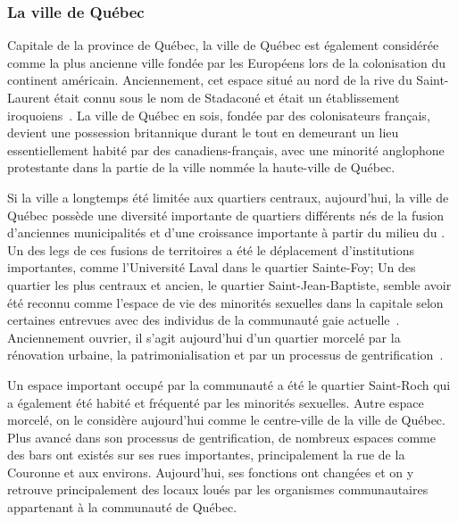 \subsubsection{La ville de Québec}
Capitale de la province de Québec, la ville de Québec est également considérée comme la plus ancienne ville fondée par les Européens lors de la colonisation du continent américain. 
Anciennement, cet espace situé au nord de la rive du Saint-Laurent était connu sous le nom de Stadaconé et était un établissement iroquoiens~\citep[91]{Dickason1996}. 
La ville de Québec en sois, fondée par des colonisateurs français, devient une possession britannique durant le  tout en demeurant un lieu essentiellement habité par des canadiens-français, avec une minorité anglophone protestante dans la partie de la ville nommée la haute-ville de Québec\missref{}.

Si la ville a longtemps été limitée aux quartiers centraux, aujourd'hui, la ville de Québec possède une diversité importante de quartiers différents nés de la fusion d'anciennes municipalités et d'une croissance importante à partir du milieu du . 
Un des legs de ces fusions de territoires a été le déplacement d'institutions importantes, comme l'Université Laval dans le quartier Sainte-Foy; Un des quartier les plus centraux et ancien, le quartier Saint-Jean-Baptiste, semble avoir été reconnu comme l'espace de vie des minorités sexuelles dans la capitale selon certaines entrevues avec des individus de la communauté gaie actuelle~\citep{CSJB2011}. 
Anciennement ouvrier, il s'agit aujourd'hui d'un quartier morcelé par la rénovation urbaine, la patrimonialisation et par un processus de gentrification~\citep{Hatvany2005,Mercier2014}.

Un espace important occupé par la communauté \lgbt{} a été le quartier Saint-Roch qui a également été habité et fréquenté par les minorités sexuelles.
Autre espace morcelé, on le considère aujourd'hui comme le centre-ville de la ville de Québec. 
Plus avancé dans son processus de gentrification, de nombreux espaces \lgbt{} comme des bars ont existés sur ses rues importantes, principalement la rue de la Couronne et aux environs. 
Aujourd'hui, ses fonctions ont changées et on y retrouve principalement des locaux loués par les organismes communautaires appartenant à la communauté \lgbt{} de Québec.

